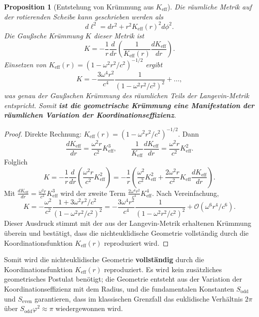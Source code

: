 \documentclass[12pt,a4paper]{article}
\newtheorem{proposition}{Proposition}[section]
\newcommand{\Sodd}{S_{\mathrm{odd}}}
\newcommand{\Seven}{S_{\mathrm{even}}}
\begin{document}
	\begin{proposition}[Entstehung von Krümmung aus \(K_{\mathrm{eff}}\)]
		Die räumliche Metrik auf der rotierenden Scheibe kann geschrieben werden als
		\[
		d\ell^2 = dr^2 + r^2 K_{\mathrm{eff}}(r)^2 d\phi^2.
		\]
		Die Gaußsche Krümmung \(K\) dieser Metrik ist
		\[
		K = -\frac{1}{r} \frac{d}{dr}\left( \frac{1}{K_{\mathrm{eff}}(r)} \frac{dK_{\mathrm{eff}}}{dr} \right).
		\]
		Einsetzen von \(K_{\mathrm{eff}}(r) = (1 - \omega^2 r^2/c^2)^{-1/2}\) ergibt
		\[
		K = -\frac{3\omega^4 r^2}{c^4} \frac{1}{(1 - \omega^2 r^2/c^2)^2} + \dots,
		\]
		was genau der Gaußschen Krümmung des räumlichen Teils der Langevin-Metrik entspricht. Somit \textbf{ist die geometrische Krümmung eine Manifestation der räumlichen Variation der Koordinationseffizienz}.
	\end{proposition}
	
	\begin{proof}
		Direkte Rechnung: \(K_{\mathrm{eff}}(r) = (1 - \omega^2 r^2/c^2)^{-1/2}\). Dann
		\[
		\frac{dK_{\mathrm{eff}}}{dr} = \frac{\omega^2 r}{c^2} K_{\mathrm{eff}}^3,\qquad
		\frac{1}{K_{\mathrm{eff}}} \frac{dK_{\mathrm{eff}}}{dr} = \frac{\omega^2 r}{c^2} K_{\mathrm{eff}}^2.
		\]
		Folglich
		\[
		K = -\frac{1}{r} \frac{d}{dr}\left( \frac{\omega^2 r}{c^2} K_{\mathrm{eff}}^2 \right) = -\frac{1}{r} \left( \frac{\omega^2}{c^2} K_{\mathrm{eff}}^2 + \frac{2\omega^2 r}{c^2} K_{\mathrm{eff}} \frac{dK_{\mathrm{eff}}}{dr} \right).
		\]
		Mit \(\frac{dK_{\mathrm{eff}}}{dr} = \frac{\omega^2 r}{c^2} K_{\mathrm{eff}}^3\) wird der zweite Term \(\frac{2\omega^4 r^2}{c^4} K_{\mathrm{eff}}^4\). Nach Vereinfachung,
		\[
		K = -\frac{\omega^2}{c^2} \frac{1 + 3\omega^2 r^2/c^2}{(1 - \omega^2 r^2/c^2)^2} = -\frac{3\omega^4 r^2}{c^4} \frac{1}{(1 - \omega^2 r^2/c^2)^2} + \mathcal{O}(\omega^6 r^4/c^6).
		\]
		Dieser Ausdruck stimmt mit der aus der Langevin-Metrik erhaltenen Krümmung überein und bestätigt, dass die nichteuklidische Geometrie vollständig durch die Koordinationsfunktion \(K_{\mathrm{eff}}(r)\) reproduziert wird.
	\end{proof}
	
	Somit wird die nichteuklidische Geometrie \textbf{vollständig} durch die Koordinationsfunktion \(K_{\mathrm{eff}}(r)\) reproduziert. Es wird kein zusätzliches geometrisches Postulat benötigt; die Geometrie entsteht aus der Variation der Koordinationseffizienz mit dem Radius, und die fundamentalen Konstanten \(\Sodd\) und \(\Seven\) garantieren, dass im klassischen Grenzfall das euklidische Verhältnis \(2\pi\) über \(\Sodd \varphi^2 \approx \pi\) wiedergewonnen wird.
	
\end{document}
